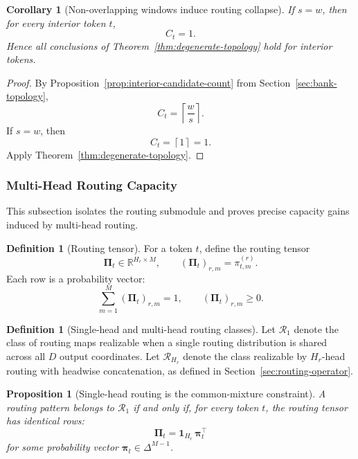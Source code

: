 \documentclass{article}
\theoremstyle{plain}
\newtheorem{proposition}[theorem]{Proposition}
\newtheorem{corollary}[theorem]{Corollary}
\theoremstyle{definition}
\newtheorem{definition}[theorem]{Definition}
\theoremstyle{remark}
\begin{document}
\begin{corollary}[Non-overlapping windows induce routing collapse]
\label{cor:stride-equals-window}
If $s=w$, then for every interior token $t$,
\[
C_{t}=1.
\]
Hence all conclusions of Theorem~\ref{thm:degenerate-topology} hold for interior tokens.
\end{corollary}

\begin{proof}
By Proposition~\ref{prop:interior-candidate-count} from Section~\ref{sec:bank-topology},
\[
C_{t}
=
\left\lceil \frac{w}{s}\right\rceil.
\]
If $s=w$, then
\[
C_{t}=\left\lceil 1\right\rceil=1.
\]
Apply Theorem~\ref{thm:degenerate-topology}.
\end{proof}

\subsubsection{Multi-Head Routing Capacity}
\label{sec:tier-a-multihead-capacity}

This subsection isolates the routing submodule and proves precise capacity gains induced by multi-head routing.

\begin{definition}[Routing tensor]
\label{def:routing-tensor}
For a token $t$, define the routing tensor
\[
\boldsymbol{\Pi}_{t} \in \mathbb{R}^{H_r \times M},
\qquad
(\boldsymbol{\Pi}_{t})_{r,m} = \pi^{(r)}_{t,m}.
\]
Each row is a probability vector:
\[
\sum_{m=1}^{M} (\boldsymbol{\Pi}_{t})_{r,m}=1,
\qquad
(\boldsymbol{\Pi}_{t})_{r,m}\ge 0.
\]
\end{definition}

\begin{definition}[Single-head and multi-head routing classes]
\label{def:routing-classes}
Let $\mathcal{R}_1$ denote the class of routing maps realizable when a single routing distribution is shared across all $D$ output coordinates. Let $\mathcal{R}_{H_r}$ denote the class realizable by $H_r$-head routing with headwise concatenation, as defined in Section~\ref{sec:routing-operator}.
\end{definition}

\begin{proposition}[Single-head routing is the common-mixture constraint]
\label{prop:single-head-common-mixture}
A routing pattern belongs to $\mathcal{R}_1$ if and only if, for every token $t$, the routing tensor has identical rows:
\begin{equation}
\label{eq:single-head-common-mixture}
\boldsymbol{\Pi}_{t}
=
\mathbf{1}_{H_r}\,\boldsymbol{\pi}_{t}^{\top}
\end{equation}
for some probability vector $\boldsymbol{\pi}_{t}\in \Delta^{M-1}$.
\end{proposition}
\end{document}
